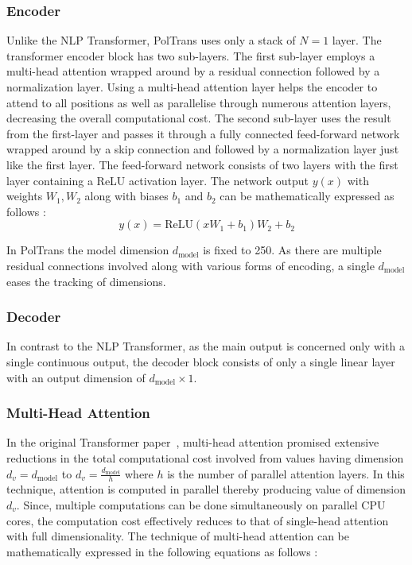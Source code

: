 \documentclass[10pt,journal]{IEEEtran}
\begin{document}
\subsubsection{Encoder}
Unlike the NLP Transformer, {PolTrans} uses only a stack of ${N = 1}$ layer. The transformer encoder block has two sub-layers. The first sub-layer employs a multi-head attention wrapped around by a residual connection followed by a normalization layer. Using a multi-head attention layer helps the encoder to attend to all positions as well as parallelise through numerous attention layers, decreasing the overall computational cost. The second sub-layer uses the result from the first-layer and passes it through a fully connected feed-forward network wrapped around by a skip connection and followed by a normalization layer just like the first layer.
The feed-forward network consists of two layers with the first layer containing a ReLU activation layer. The network output ${y(x)}$ with weights ${W_1, W_2}$ along with biases ${b_1}$ and ${b_2}$ can be mathematically expressed as follows :
\begin{equation}
y (x) = \text{ReLU}(xW_1 + b_1)W_2 + b_2
\end{equation}

In {PolTrans} the model dimension ${d_{\text{model}}}$ is fixed to 250. As there are multiple residual connections involved along with various forms of encoding, a single ${d_{\text{model}}}$ eases the tracking of dimensions.

\subsubsection{Decoder}
In contrast to the NLP Transformer, as the main output is concerned only with a single continuous output, the decoder block consists of only a single linear layer with an output dimension of ${d_{\text{model}} \times 1}$.

\subsubsection{Multi-Head Attention}
In the original Transformer paper~\cite{Vaswani.2017}, multi-head attention promised extensive reductions in the total computational cost involved from values having dimension ${d_{v} = d_{\text{model}}}$ to ${d_{v} = \frac{d_{\text{model}}}{h}}$ where ${h}$ is the number of parallel attention layers. In this technique, attention is computed in parallel thereby producing value of dimension ${d_{v}}$. Since, multiple computations can be done simultaneously on parallel CPU cores, the computation cost effectively reduces to that of single-head attention with full dimensionality. The technique of multi-head attention can be mathematically expressed in the following equations as follows :
\end{document}
